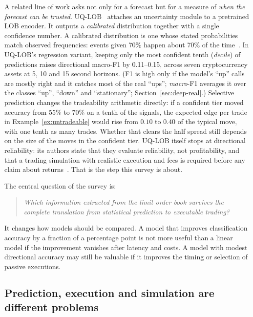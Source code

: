 A related line of work asks not only for a forecast but for a measure of \emph{when the forecast
can be trusted}. UQ-LOB~\citep{manoharan2026uqlob} attaches an uncertainty module to a pretrained
LOB encoder. It outputs a \emph{calibrated} distribution together with a single confidence number. A calibrated
distribution is one whose stated probabilities match observed frequencies: events given 70\% happen about 70\% of
the time~\citep{guo2017}. In UQ-LOB's regression variant, keeping only the most confident tenth (\emph{decile}) of
predictions raises directional macro-F1 by 0.11--0.15, across seven cryptocurrency assets at 5, 10 and 15 second
horizons. (F1 is high only if the model's ``up'' calls are mostly right and it catches most of the real ``ups'';
\emph{macro}-F1 averages it over the classes ``up'', ``down'' and ``stationary''; Section~\ref{sec:deep-real}.) Selective
prediction changes the tradeability arithmetic directly: if a confident tier moved accuracy from
55\% to 70\% on a tenth of the signals, the expected edge per trade in
Example~\ref{ex:untradeable} would rise from $0.10$ to $0.40$ of the typical move, with one tenth
as many trades. Whether that clears the half spread still depends on the size of the moves in the
confident tier. UQ-LOB itself stops at directional reliability: its authors state that they
evaluate reliability, not profitability, and that a trading simulation with realistic execution
and fees is required before any claim about returns~\citep{manoharan2026uqlob}. That is the step
this survey is about.

The central question of the survey is:

\begin{quote}
\emph{Which information extracted from the limit order book survives the complete translation from
statistical prediction to executable trading?}
\end{quote}

It changes how models should be compared. A model that improves classification accuracy by a
fraction of a percentage point is not more useful than a linear model if the improvement vanishes
after latency and costs. A model with modest directional accuracy may still be valuable if it
improves the timing or selection of passive executions.

\subsection{Prediction, execution and simulation are different problems}
\label{sec:three-problems}

